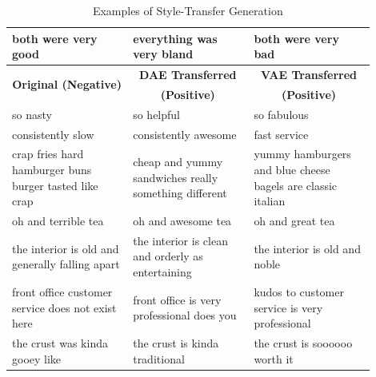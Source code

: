 \documentclass[letterpaper]{article} %
\newcommand{\tabh}[1]{\multicolumn{1}{c|}{\textbf{#1}}}
\newcommand{\tabc}[2]{\multicolumn{1}{|c||}{\multirow{#1}{*}{\textbf{#2}}}}
\begin{document}
\begin{table}[ht]
\begin{tabular}{| p{0.3\linewidth} || p{0.3\linewidth} | p{0.3\linewidth} |}
		\hline
		both were very good                                    & everything was very bland                                      & both were very bad                                          \\
		\hline
		\hline
		\hline
		\tabc{2}{Original (Negative)}                          & \tabh{DAE Transferred}                                         & \tabh{VAE Transferred}                                      \\
		                                                       & \tabh{(Positive)}                                              & \tabh{(Positive)}                                           \\
		\hline
		\hline
		so nasty                                               & so helpful                                                     & so fabulous                                                 \\
		\hline
		consistently slow                                      & consistently awesome                                           & fast service                                                \\
		\hline
		crap fries hard hamburger buns burger tasted like crap & cheap and yummy sandwiches really something different          & yummy hamburgers and blue cheese bagels are classic italian \\
		\hline
		oh and terrible tea                                    & oh and awesome tea                                             & oh and great tea                                            \\
		\hline
		the interior is old and generally falling apart        & the interior is clean and orderly as entertaining              & the interior is old and noble                               \\
		\hline
		front office customer service does not exist here      & front office is very professional does you                     & kudos to customer service is very professional              \\
		\hline
		the crust was kinda gooey like                         & the crust is kinda traditional                                 & the crust is soooooo worth it                               \\
		\hline
	\end{tabular}
	\caption{Examples of Style-Transfer Generation}
	\label{tab:transfer-samples}
\end{table}
\end{document}
